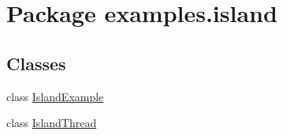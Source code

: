 \hypertarget{namespaceexamples_1_1island}{\section{Package examples.\-island}
\label{namespaceexamples_1_1island}
}
\subsection*{Classes}
\begin{DoxyCompactItemize}
\item 
class \hyperlink{classexamples_1_1island_1_1_island_example}{Island\-Example}
\item 
class \hyperlink{classexamples_1_1island_1_1_island_thread}{Island\-Thread}
\end{DoxyCompactItemize}
